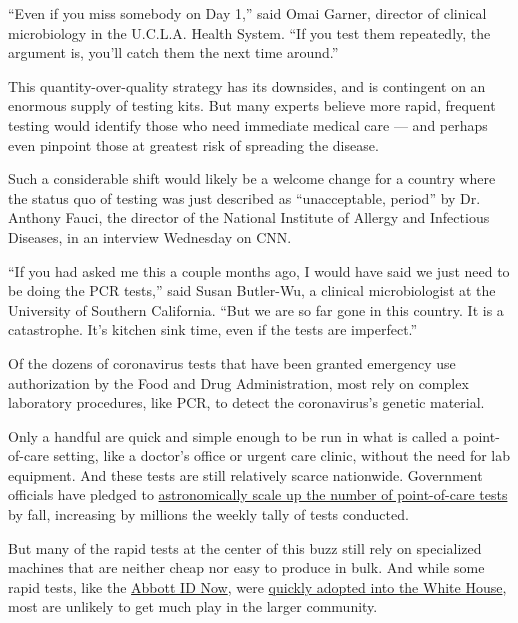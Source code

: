 ``Even if you miss somebody on Day 1,'' said Omai Garner, director of
clinical microbiology in the U.C.L.A. Health System. ``If you test them
repeatedly, the argument is, you'll catch them the next time around.''

This quantity-over-quality strategy has its downsides, and is contingent
on an enormous supply of testing kits. But many experts believe more
rapid, frequent testing would identify those who need immediate medical
care --- and perhaps even pinpoint those at greatest risk of spreading
the disease.

Such a considerable shift would likely be a welcome change for a country
where the status quo of testing was just described as ``unacceptable,
period'' by Dr. Anthony Fauci, the director of the National Institute of
Allergy and Infectious Diseases, in an interview Wednesday on CNN.

``If you had asked me this a couple months ago, I would have said we
just need to be doing the PCR tests,'' said Susan Butler-Wu, a clinical
microbiologist at the University of Southern California. ``But we are so
far gone in this country. It is a catastrophe. It's kitchen sink time,
even if the tests are imperfect.''

Of the dozens of coronavirus tests that have been granted emergency use
authorization by the Food and Drug Administration, most rely on complex
laboratory procedures, like PCR, to detect the coronavirus's genetic
material.

Only a handful are quick and simple enough to be run in what is called a
point-of-care setting, like a doctor's office or urgent care clinic,
without the need for lab equipment. And these tests are still relatively
scarce nationwide. Government officials have pledged to
\href{https://www.nih.gov/news-events/news-releases/nih-delivering-new-covid-19-testing-technologies-meet-us-demand}{astronomically
scale up the number of point-of-care tests} by fall, increasing by
millions the weekly tally of tests conducted.

But many of the rapid tests at the center of this buzz still rely on
specialized machines that are neither cheap nor easy to produce in bulk.
And while some rapid tests, like the
\href{https://www.nytimes3xbfgragh.onion/2020/07/06/health/fast-coronavirus-tests.html}{Abbott
ID Now}, were
\href{https://www.nytimes3xbfgragh.onion/interactive/2020/05/12/us/coronavirus-testing-white-house.html}{quickly
adopted into the White House}, most are unlikely to get much play in the
larger community.

